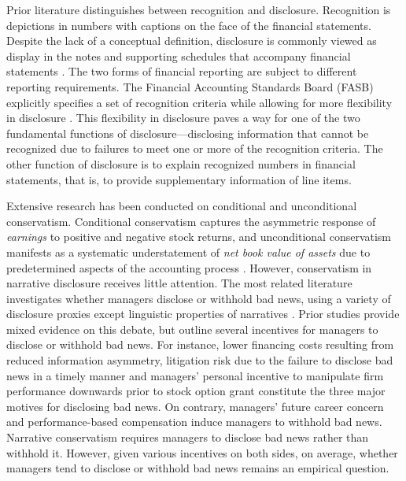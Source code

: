 \documentclass[a4paper]{article}
\begin{document}
\begin{spacing}{2}
Prior literature distinguishes between recognition and disclosure. Recognition is depictions in numbers with captions on the face of the financial statements. Despite the lack of a conceptual definition, disclosure is commonly viewed as display in the notes and supporting schedules that accompany financial statements \citep*{schipperRequiredDisclosuresFinancial2007}. The two forms of financial reporting are subject to different reporting requirements. The Financial Accounting Standards Board (FASB) explicitly specifies a set of recognition criteria while allowing for more flexibility in disclosure \citep*{fasbStatementFinancialAccounting1984}. This flexibility in disclosure paves a way for one of the two fundamental functions of disclosure---disclosing information that cannot be recognized due to failures to meet one or more of the recognition criteria. The other function of disclosure is to explain recognized numbers in financial statements, that is, to provide supplementary information of line items. 

Extensive research has been conducted on conditional and unconditional conservatism. Conditional conservatism captures the asymmetric response of \textit{earnings} to positive and negative stock returns, and unconditional conservatism manifests as a systematic understatement of \textit{net book value of assets} due to predetermined aspects of the accounting process \citep[e.g.,][]{beaverConditionalUnconditionalConservatism2005}. However, conservatism in narrative disclosure receives little attention. The most related literature investigates whether managers disclose or withhold bad news, using a variety of disclosure proxies except linguistic properties of narratives \citep*{baoManagersDiscloseWithhold2019, kothariManagersWithholdBad2009, skinnerWhyFirmsVoluntarily1994, skinnerEarningsDisclosuresStockholder1997}. Prior studies provide mixed evidence on this debate, but outline several incentives for managers to disclose or withhold bad news. For instance, lower financing costs resulting from reduced information asymmetry, litigation risk due to the failure to disclose bad news in a timely manner and managers' personal incentive to manipulate firm performance downwards prior to stock option grant constitute the three major motives for disclosing bad news. On contrary, managers' future career concern and performance-based compensation induce managers to withhold bad news. Narrative conservatism requires managers to disclose bad news rather than withhold it. However, given various incentives on both sides, on average, whether managers tend to disclose or withhold bad news remains an empirical question.


\end{spacing}
\end{document}
